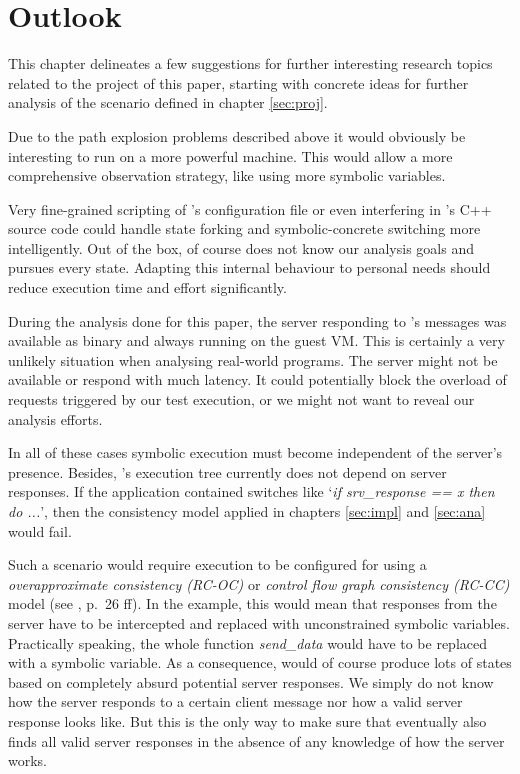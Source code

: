 \section{Outlook}\label{sec:outlook}

This chapter delineates a few suggestions for further interesting research topics related to the project of this paper, starting with concrete ideas for further analysis of the scenario defined in chapter \ref{sec:proj}.

\medskip
Due to the path explosion problems described above it would obviously be interesting to run \sse on a more powerful machine.
This would allow a more comprehensive observation strategy, like using more symbolic variables.

\medskip
Very fine-grained scripting of \sse's configuration file or even interfering in \sse's C++ source code could handle state forking and symbolic-concrete switching more intelligently.
Out of the box, \sse of course does not know our analysis goals and pursues every state.
Adapting this internal behaviour to personal needs should reduce execution time and effort significantly.

\medskip
During the analysis done for this paper, the server responding to \app's messages was available as binary and always running on the guest VM.
This is certainly a very unlikely situation when analysing real-world programs.
The server might not be available or respond with much latency.
It could potentially block the overload of requests triggered by our test execution, or we might not want to reveal our analysis efforts.

In all of these cases symbolic execution must become independent of the server's presence.
Besides, \app's execution tree currently does not depend on server responses.
If the application contained switches like `\textit{if srv\_response == x then do ...}', then the consistency model applied in chapters \ref{sec:impl} and \ref{sec:ana} would fail.

Such a scenario would require \sse execution to be configured for using a \textit{overapproximate consistency (RC-OC)} or \textit{control flow graph consistency (RC-CC)} model (see \cite{chip14s2e}, p.~26 ff).
In the \app example, this would mean that responses from the server have to be intercepted and replaced with unconstrained symbolic variables.
Practically speaking, the whole function \textit{send\_data} would have to be replaced with a symbolic variable.
As a consequence, \sse would of course produce lots of states based on completely absurd potential server responses.
We simply do not know how the server responds to a certain client message nor how a valid server response looks like.
But this is the only way to make sure that \sse eventually also finds all valid server responses in the absence of any knowledge of how the server works. 


\medskip


\iffalse
§7	Outlook
		> Was man sonst noch Tolles machen könnte.
		> Anwendung auf echte Malware, etc…
\fi


